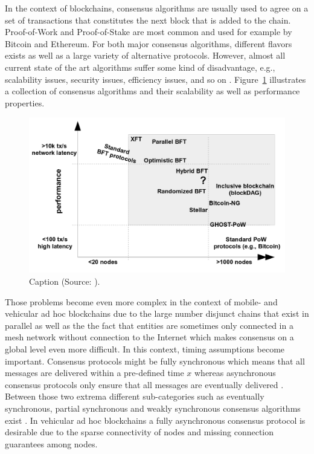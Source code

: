 \documentclass{llncs}
\begin{document}
{			In the context of blockchains, consensus algorithms are usually used to agree on a set of transactions that constitutes the next block that is added to the chain. Proof-of-Work \cite{nakamoto_bitcoin:2008} and Proof-of-Stake \cite{bibid} are most common and used for example by Bitcoin and Ethereum. For both major consensus algorithms, different flavors exists as well as a large variety of alternative protocols. However, almost all current state of the art algorithms suffer some kind of disadvantage, e.g., scalability issues, security issues, efficiency issues, and so on \cite{bibid}\cite{bibid}. Figure~\ref{fig:bft-scalability} illustrates a collection of consensus algorithms and their scalability as well as performance properties. 
			\begin{figure}
				\centering
				\includegraphics[scale=0.25]{Figures/BFT/20180904_BFT-scalability.png}
				\caption{Caption (Source: \cite{vukolic2015quest}).}
				\label{fig:bft-scalability}
			\end{figure}
			Those problems become even more complex in the  context of mobile- and vehicular ad hoc blockchains due to the large number disjunct chains that exist in parallel as well as the the fact that entities are sometimes only connected in a mesh network without connection to the Internet which makes consensus on a global level even more difficult. In this context, timing assumptions become important. Consensus protocols might be fully synchronous which means that all messages are delivered within a pre-defined time  $x$ whereas asynchronous consensus protocols only ensure that all messages are eventually delivered \cite{bibid}. Between those two extrema different sub-categories such as eventually synchronous, partial synchronous and weakly synchronous consensus algorithms exist \cite{bibid}\cite{bibid}\cite{bibid}. In vehicular ad hoc blockchains a fully asynchronous consensus protocol is  desirable due to the sparse connectivity of nodes and missing connection guarantees among nodes.
						
}
\end{document}
